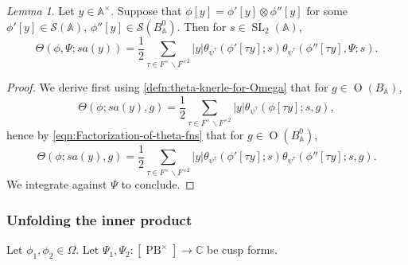 \documentclass[reqno,10pt]{amsart}
\theoremstyle{plain} %
\theoremstyle{definition}
\theoremstyle{plain} %
\theoremstyle{remark}
\theoremstyle{itplain} %
\newtheorem*{lemma*}{Lemma}
\theoremstyle{remark} %
\numberwithin{equation}{section}
\DeclareMathOperator{\SL}{SL}
\def\PB{\operatorname{PB}}
\def\O{\operatorname{O}}
\begin{document}
\begin{lemma*}
  Let $y \in \mathbb{A}^\times$.  Suppose that $\phi [y] = \phi '[y] \otimes \phi ''[y]$
  for some $\phi '[y] \in \mathcal{S}(\mathbb{A})$, $\phi ''[y] \in \mathcal{S}(B_\mathbb{A}^0)$.  Then for $s \in \SL_2(\mathbb{A})$,
  \begin{equation}\label{eqn:simliitude-theta-expand-as-sum-of-pure-tensors-and-over-a}
    \Theta(\phi,\Psi;s a(y))
    =
    \frac{1}{2}
    \sum_{\tau \in F^\times \backslash F^{\times 2}}
    |y|
    \theta_{\psi^\tau}(\phi'[\tau y];s)
    \theta_{\psi^\tau}(\phi''[\tau y],\Psi;s).
  \end{equation}
\end{lemma*}
\begin{proof}
  We derive first using \eqref{defn:theta-knerle-for-Omega} that for $g \in \O(B_{\mathbb{A}})$,
  \[
    \Theta(\phi;s a(y),g) = \frac{1}{2} \sum_{\tau \in F^\times \backslash F^{\times 2}} |y| \theta_{\psi^\tau}(\phi[\tau y];s,g),
  \]
  hence by \eqref{eqn:Factorization-of-theta-fns} that for $g \in \O(B_\mathbb{A}^0)$,
  \[
    \Theta(\phi;s a(y),g) = \frac{1}{2} \sum_{\tau \in F^\times \backslash F^{\times 2}} |y| \theta_{\psi^\tau}(\phi'[\tau y];s) \theta_{\psi^\tau}(\phi''[\tau y];s,g).
  \]
  We integrate against $\Psi$ to conclude.
\end{proof}










\subsubsection{Unfolding the inner product}\label{sec:unfold-inner-product-nontraditional-theta-over-sl2}
Let $\phi_1, \phi_2 \in \Omega$.  Let $\Psi_1, \Psi_2 : [\PB^\times] \rightarrow \mathbb{C}$ be cusp forms.
\end{document}

